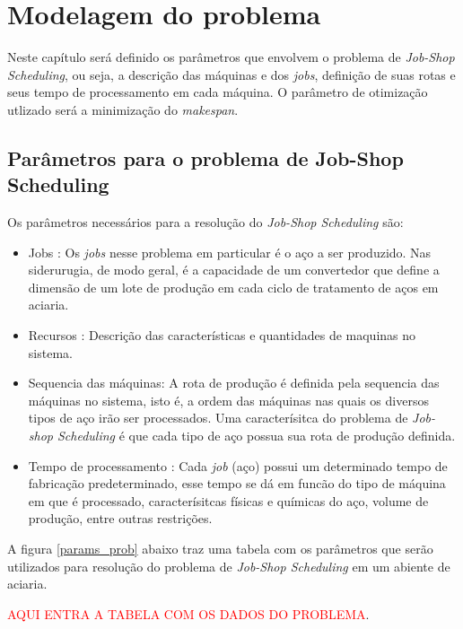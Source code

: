 \chapter{Modelagem do problema}
Neste capítulo será definido os parâmetros que envolvem o problema de {\it Job-Shop Scheduling}, ou seja, a descrição das máquinas e dos {\it jobs}, definição de suas rotas e seus tempo de processamento em cada máquina. O parâmetro de otimização  utlizado será a minimização do {\it makespan}.

\section{Parâmetros para o  problema de Job-Shop Scheduling}
Os parâmetros necessários para a resolução do {\it Job-Shop Scheduling} são:
\begin{itemize}
\item {Jobs} : Os {\it jobs} nesse problema em particular é o aço a ser produzido. Nas siderurugia, de modo geral, é a capacidade de um convertedor que define a dimensão de um lote de produção em cada ciclo de tratamento de aços em aciaria.

\item {Recursos} : Descrição das características e quantidades de maquinas no sistema.

\item{Sequencia das máquinas}: A rota de produção é definida pela sequencia das máquinas no sistema, isto é, a ordem das máquinas nas quais os diversos tipos de aço irão ser processados. Uma caracterísitca do 
problema de {\it Job-shop Scheduling} é que cada tipo de aço possua sua rota de produção definida.

\item{Tempo de processamento} : Cada {\it job} (aço) possui um determinado tempo de fabricação predeterminado, esse tempo se dá em funcão do tipo de máquina em que é processado, caracterísitcas físicas e químicas do aço, volume de produção, entre outras restrições.

\end{itemize}

A figura \ref{params_prob} abaixo traz uma tabela com os parâmetros que serão utilizados para resolução do problema de {\it Job-Shop Scheduling} em um abiente de aciaria.

\textcolor{red}{AQUI ENTRA A TABELA COM OS DADOS DO PROBLEMA}.



